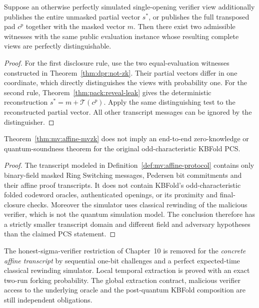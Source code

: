 \begin{theorem}\label{thm:mv:raw-oracle-leak}
Suppose an otherwise perfectly
simulated single-opening verifier
view additionally publishes the
entire unmasked partial vector
$s^*$, or publishes the full
transposed pad $c^p$ together
with the masked vector $m$.
Then there exist two admissible
witnesses with the same public
evaluation instance whose
resulting complete views are
perfectly distinguishable.
\end{theorem}
\begin{proof}
For the first disclosure rule,
use the two equal-evaluation
witnesses constructed in
Theorem~\ref{thm:dpr:not-zk}.
Their partial vectors differ
in one coordinate, which
directly distinguishes the
views with probability one.
For the second rule,
Theorem~\ref{thm:pack:reveal-leak}
gives the deterministic
reconstruction
$s^*=m+\mathcal T(c^p)$.
Apply the same distinguishing
test to the reconstructed
partial vector. All other
transcript messages can be
ignored by the distinguisher.
\end{proof}

\begin{proposition}\label{prop:mv:not-kbfold}
Theorem~\ref{thm:mv:affine-mvzk}
does not imply an end-to-end
zero-knowledge or quantum-soundness
theorem for the original
odd-characteristic KBFold PCS.
\end{proposition}
\begin{proof}
The transcript modeled in
Definition~\ref{def:mv:affine-protocol}
contains only binary-field
masked Ring Switching messages,
Pedersen bit commitments and
their affine proof transcripts.
It does not contain KBFold's
odd-characteristic folded codeword
oracles, authenticated openings,
or its proximity and final-closure
checks. Moreover the simulator
uses classical rewinding of the
malicious verifier, which is not
the quantum simulation model.
The conclusion therefore has
a strictly smaller transcript
domain and different field and
adversary hypotheses than the
claimed PCS statement.
\end{proof}

\begin{remark}
The honest-sigma-verifier restriction
of Chapter~10 is removed for the
\emph{concrete affine transcript}
by sequential one-bit challenges
and a perfect expected-time
classical rewinding simulator.
Local temporal extraction is proved
with an exact two-run forking
probability. The global extraction
contract, malicious verifier access
to the underlying oracle and the
post-quantum KBFold composition
are still independent obligations.
\end{remark}
